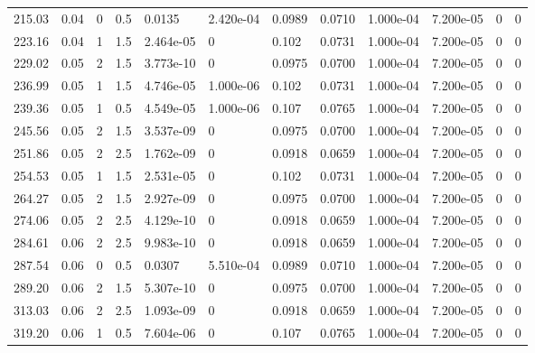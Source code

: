 \documentclass[preview]{standalone}
\begin{document}
{{\begin{tabular}{L{1.2cm}C{1.2cm} C{0.3cm}C{0.5cm} C{1.4cm}C{1.4cm} C{1.4cm}C{1.4cm} C{1.6cm}C{1.6cm} C{1.6cm}C{1.6cm}}
  215.03  &  0.04  & 0     & 0.5 &  0.0135  & 2.420e-04  &  0.0989&   0.0710& 1.000e-04 & 7.200e-05   &  0 & 0  \\ 
  223.16  &  0.04  & 1     & 1.5 &  2.464e-05  & 0  &  0.102&   0.0731& 1.000e-04 & 7.200e-05   &  0 & 0  \\ 
  229.02  &  0.05  & 2     & 1.5 &  3.773e-10  & 0  &  0.0975&   0.0700& 1.000e-04 & 7.200e-05   &  0 & 0  \\ 
  236.99  &  0.05  & 1     & 1.5 &  4.746e-05  & 1.000e-06  &  0.102&   0.0731& 1.000e-04 & 7.200e-05   &  0 & 0  \\ 
  239.36  &  0.05  & 1     & 0.5 &  4.549e-05  & 1.000e-06  &  0.107&   0.0765& 1.000e-04 & 7.200e-05   &  0 & 0  \\ 
  245.56  &  0.05  & 2     & 1.5 &  3.537e-09  & 0  &  0.0975&   0.0700& 1.000e-04 & 7.200e-05   &  0 & 0  \\ 
  251.86  &  0.05  & 2     & 2.5 &  1.762e-09  & 0  &  0.0918&   0.0659& 1.000e-04 & 7.200e-05   &  0 & 0  \\ 
  254.53  &  0.05  & 1     & 1.5 &  2.531e-05  & 0  &  0.102&   0.0731& 1.000e-04 & 7.200e-05   &  0 & 0  \\ 
  264.27  &  0.05  & 2     & 1.5 &  2.927e-09  & 0  &  0.0975&   0.0700& 1.000e-04 & 7.200e-05   &  0 & 0  \\ 
  274.06  &  0.05  & 2     & 2.5 &  4.129e-10  & 0  &  0.0918&   0.0659& 1.000e-04 & 7.200e-05   &  0 & 0  \\ 
  284.61  &  0.06  & 2     & 2.5 &  9.983e-10  & 0  &  0.0918&   0.0659& 1.000e-04 & 7.200e-05   &  0 & 0  \\ 
  287.54  &  0.06  & 0     & 0.5 &  0.0307  & 5.510e-04  &  0.0989&   0.0710& 1.000e-04 & 7.200e-05   &  0 & 0  \\ 
  289.20  &  0.06  & 2     & 1.5 &  5.307e-10  & 0  &  0.0975&   0.0700& 1.000e-04 & 7.200e-05   &  0 & 0  \\ 
  313.03  &  0.06  & 2     & 2.5 &  1.093e-09  & 0  &  0.0918&   0.0659& 1.000e-04 & 7.200e-05   &  0 & 0  \\ 
  319.20  &  0.06  & 1     & 0.5 &  7.604e-06  & 0  &  0.107&   0.0765& 1.000e-04 & 7.200e-05   &  0 & 0  \\ 
\hline 
\end{tabular} 

}}
\end{document}
